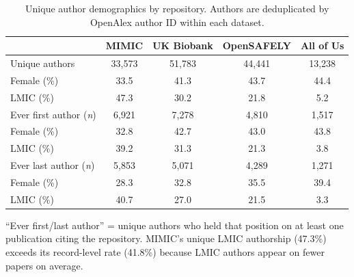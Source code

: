 \documentclass[11pt]{article}
\begin{document}
\begin{table}[H]
\centering
\caption{Unique author demographics by repository. Authors are deduplicated by OpenAlex author ID within each dataset.}
\label{etab:unique}
\small
\begin{tabular}{@{}lcccc@{}}
\toprule
& \textbf{MIMIC} & \textbf{UK Biobank} & \textbf{OpenSAFELY} & \textbf{All of Us} \\
\midrule
Unique authors & 33,573 & 51,783 & 44,441 & 13,238 \\
Female (\%) & 33.5 & 41.3 & 43.7 & 44.4 \\
LMIC (\%) & 47.3 & 30.2 & 21.8 & 5.2 \\
\midrule
Ever first author (\textit{n}) & 6,921 & 7,278 & 4,810 & 1,517 \\
\quad Female (\%) & 32.8 & 42.7 & 43.0 & 43.8 \\
\quad LMIC (\%) & 39.2 & 31.3 & 21.3 & 3.8 \\
\midrule
Ever last author (\textit{n}) & 5,853 & 5,071 & 4,289 & 1,271 \\
\quad Female (\%) & 28.3 & 32.8 & 35.5 & 39.4 \\
\quad LMIC (\%) & 40.7 & 27.0 & 21.5 & 3.3 \\
\bottomrule
\end{tabular}

\vspace{4pt}
{\footnotesize ``Ever first/last author'' = unique authors who held that position on at least one publication citing the repository. MIMIC's unique LMIC authorship (47.3\%) exceeds its record-level rate (41.8\%) because LMIC authors appear on fewer papers on average.}
\end{table}
\end{document}
